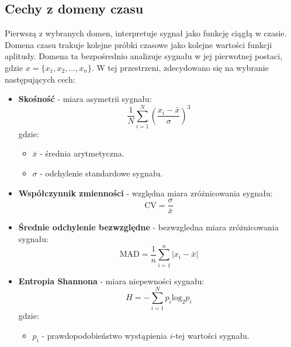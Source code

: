 \documentclass[a4paper,twoside,12pt]{book}
\begin{document}
\subsection{Cechy z domeny czasu}
Pierwszą z wybranych domen, interpretuje sygnał jako funkcję ciągłą w czasie. Domena czasu trakuje kolejne próbki czasowe jako kolejne wartości funkcji aplitudy. Domena ta bezpośrednio analizuje sygnału w jej pierwotnej postaci, gdzie $x = \{x_1, x_2, \ldots, x_n\}$. W tej przestrzeni, zdecydowano się na wybranie następujących cech:
\begin{itemize}
	\item \textbf{Skośność} - miara asymetrii sygnału:
	      \begin{equation}
		      \frac{1}{N} \sum_{i=1}^{N} \left( \frac{x_i - \bar{x}}{\sigma} \right)^3
	      \end{equation}
	      gdzie:
	      \begin{itemize}
		      \item \( \bar{x} \) - średnia arytmetyczna.
		      \item \( \sigma \) - odchylenie standardowe sygnału.
	      \end{itemize}
	\item \textbf{Współczynnik zmienności} -  względna miara zróżnicowania sygnału:
	      \begin{equation}
		      \text{CV} = \frac{\sigma}{\bar{x}}
	      \end{equation}
	\item \textbf{Średnie odchylenie bezwzględne} - bezwzgledna miara zróżnicowania sygnału:
	      \begin{equation}
		      \text{MAD} = \frac{1}{n} \sum_{i=1}^{n} \left| x_i - \bar{x} \right|
	      \end{equation}

	\item \textbf{Entropia Shannona} - miara niepewności sygnału:
	      \begin{equation}
		      H = -\sum_{i=1}^{N} p_i \mathrm{log}_{2} p_i
	      \end{equation}
	      gdzie:
	      \begin{itemize}
		      \item \( p_i \) - prawdopodobieństwo wystąpienia \( i \)-tej wartości sygnału.
	      \end{itemize}





\end{itemize}
\end{document}

